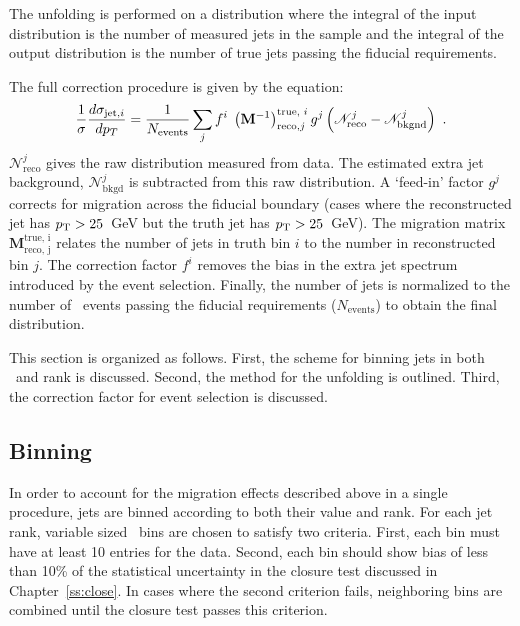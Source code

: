 The unfolding is performed on a distribution where the integral of the input distribution is the
number of measured jets in the sample and the integral of the output distribution is the number
of true jets passing the fiducial requirements. 

The full correction procedure is given by the equation:
\begin{equation}
\frac{1}{\sigma} \frac{d \sigma_{\mathrm{jet,}i}}{dp_T} = \frac{1}{N_{\textrm{events}}}\sum_j f^i \;\left ({\mathbf M}^{-1}\right )_{\textrm{reco,} j}^{\textrm{true, }i} g^j \left ({\mathscr N}^j_{\textrm {reco}}-
{\mathscr N}^j_{\textrm{bkgnd}} \right ) \ .
\label{eqn:unffinal}
\end{equation}
\noindent  ${\mathscr N}^j_{\textrm {reco}}$ gives the raw distribution measured from data. The estimated extra jet background, ${\mathscr N}^j_{\textrm{bkgd}}$ is subtracted from this raw distribution. 
A `feed-in' factor $g^j$ corrects for migration across the fiducial boundary (cases where the reconstructed jet has
$p_{\text{T}}>25$~GeV but the truth jet has $p_{\text{T}}>25$~GeV). The migration matrix ${\mathbf M}_{\textrm{reco, j}}^{\textrm{true, i}}$ 
relates the number of jets in truth bin $i$ to the number in reconstructed bin $j$. The correction factor $f^i$ 
removes the bias in the extra jet spectrum introduced by the event selection. Finally, the number of jets is normalized to the number of \emubb\ events passing the fiducial requirements ($N_{\textrm{events}}$) to obtain the final distribution.

This section is organized as follows.
First, the scheme for binning jets in both \pt\ and rank is discussed. 
Second, the method for the unfolding is outlined. Third, the correction factor for event selection is discussed.

\subsection{Binning}

In order to account for the migration effects described above in a single procedure, jets are binned according to both their \pt value and rank. 
For each jet rank, variable sized \pt\ bins are chosen to satisfy two criteria.
First, each bin must have at least 10 entries for the data. Second, each bin should show bias of less than 10\% of the statistical uncertainty in the closure test discussed in Chapter~\ref{ss:close}. In cases where the second criterion fails, neighboring bins are combined until the closure test passes this criterion. %


